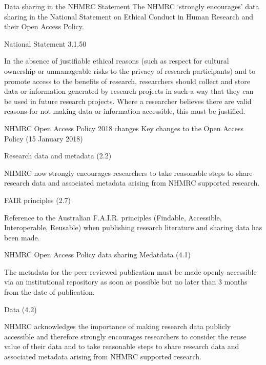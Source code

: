 \documentclass[aspectratio=169, 12pt]{beamer} %
\begin{document}
\begin{frame}{Data sharing in the NHMRC Statement}
    The NHMRC `strongly encourages' data sharing in the National Statement on Ethical Conduct in Human Research and their Open Access Policy. \cite{Nhmrc2018-sj, Nhmrc2018-vn} \par
    National Statement 3.1.50 \par
    In the absence of justifiable ethical reasons (such as respect for cultural ownership or unmanageable risks to the privacy of research participants) and to promote access to the benefits of research, researchers should collect and store data or information generated by research projects in such a way that they can be used in future research projects. Where a researcher believes there are valid reasons for not making data or information accessible, this must be justified.
\end{frame}

\begin{frame}{NHMRC Open Access Policy 2018 changes}
    Key changes to the Open Access Policy (15 January 2018) \par
    Research data and metadata (2.2) \par
    NHMRC now strongly encourages researchers to take reasonable steps to share research data and associated metadata arising from NHMRC supported research.\par
    FAIR principles (2.7) \par
    Reference to the Australian F.A.I.R. principles (Findable, Accessible, Interoperable, Reusable) when publishing research literature and sharing data has been made.
\end{frame}

\begin{frame}{NHMRC Open Access Policy data sharing}
    Medatdata (4.1) \par
    The metadata for the peer-reviewed publication must be made openly accessible via an institutional repository as soon as possible but no later than 3 months from the date of publication. \par
    Data (4.2) \par
    NHMRC acknowledges the importance of making research data publicly accessible and therefore strongly encourages researchers to consider the reuse value of their data and to take reasonable steps to share research data and associated metadata arising from NHMRC supported research.
\end{frame}
\end{document}
